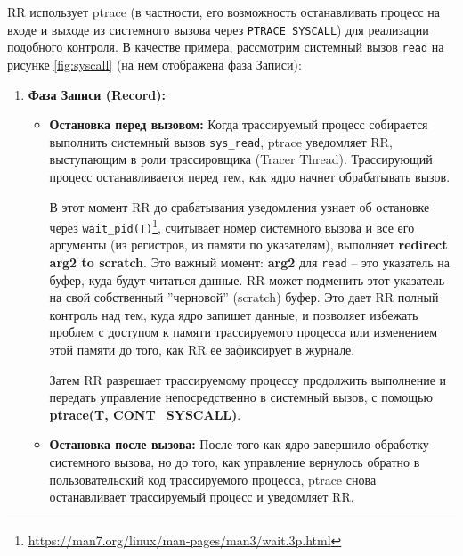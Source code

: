 RR использует ptrace (в частности, его возможность останавливать процесс на
входе и выходе из системного вызова через \texttt{PTRACE\_SYSCALL}) для
реализации подобного контроля. В качестве примера, рассмотрим системный вызов
\texttt{read} на рисунке \ref{fig:syscall} (на нем отображена фаза Записи):

\begin{enumerate}

  \item \textbf{Фаза Записи (Record):}

    \begin{itemize}

      \item \textbf{Остановка перед вызовом:} Когда трассируемый процесс
      собирается выполнить системный вызов \texttt{sys\_read}, ptrace
      уведомляет RR, выступающим в роли трассировщика (Tracer Thread).
      Трассирующий процесс останавливается перед тем, как ядро начнет
      обрабатывать вызов.

      В этот момент RR до срабатывания уведомления узнает об остановке через
      \texttt{wait\_pid(T)}\footnote{\url{https://man7.org/linux/man-pages/man3/wait.3p.html}},
      считывает номер системного вызова и все его аргументы (из регистров, из
      памяти по указателям), выполняет \textbf{redirect arg2 to scratch}. Это
      важный момент: \textbf{arg2} для \texttt{read} – это указатель на буфер, куда
      будут читаться данные. RR может подменить этот указатель на свой
      собственный ''черновой'' (scratch) буфер. Это дает RR полный контроль над
      тем, куда ядро запишет данные, и позволяет избежать проблем с доступом к
      памяти трассируемого процесса или изменением этой памяти до того, как RR
      ее зафиксирует в журнале.

      Затем RR разрешает трассируемому процессу продолжить выполнение и
      передать управление непосредственно в системный вызов, с помощью
      \textbf{ptrace(T, CONT\_SYSCALL)}.

      \item{\textbf{Остановка после вызова:}} После того как ядро завершило
      обработку системного вызова, но до того, как управление вернулось обратно
      в пользовательский код трассируемого процесса, ptrace снова останавливает
      трассируемый процесс и уведомляет RR.



\end{itemize}
\end{enumerate}
